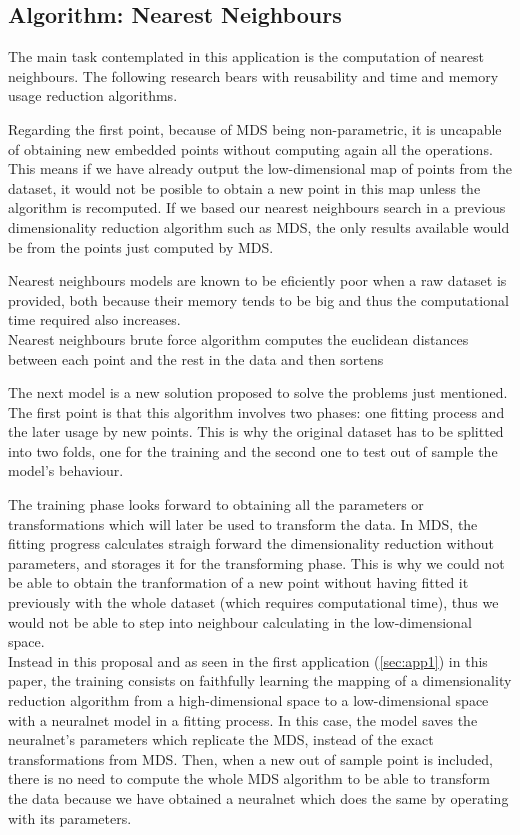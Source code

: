 \documentclass[a4paper,11pt,spanish]{report}
\begin{document}
\subsection{Algorithm: Nearest Neighbours}
\label{ssec:nneigh}

The main task contemplated in this application is the computation of nearest neighbours. The following research bears with reusability and time and memory usage reduction algorithms.

Regarding the first point, because of MDS being non-parametric, it is uncapable of obtaining new embedded points without computing again all the operations. This means if we have already output the low-dimensional map of points from the dataset, it would not be posible to obtain a new point in this map unless the algorithm is recomputed. If we based our nearest neighbours search in a previous dimensionality reduction algorithm such as MDS, the only results available would be from the points just computed by MDS.

Nearest neighbours models are known to be eficiently poor when a raw dataset is provided, both because their memory tends to be big and thus the computational time required also increases.\\
Nearest neighbours brute force algorithm computes the euclidean distances between each point and the rest in the data and then sortens

The next model is a new solution proposed to solve the problems just mentioned.\\
The first point is that this algorithm involves two phases: one fitting process and the later usage by new points. This is why the original dataset has to be splitted into two folds, one for the training and the second one to test out of sample the model's behaviour.

The training phase looks forward to obtaining all the parameters or transformations which will later be used to transform the data. In MDS, the fitting progress calculates straigh forward the dimensionality reduction without parameters, and storages it for the transforming phase. This is why we could not be able to obtain the tranformation of a new point without having fitted it previously with the whole dataset (which requires computational time), thus we would not be able to step into neighbour calculating in the low-dimensional space.\\
Instead in this proposal and as seen in the first application (\ref{sec:app1}) in this paper, the training consists on faithfully learning the mapping of a dimensionality reduction algorithm from a high-dimensional space to a low-dimensional space with a neuralnet model in a fitting process. In this case, the model saves the neuralnet's parameters which replicate the MDS, instead of the exact transformations from MDS. Then, when a new out of sample point is included, there is no need to compute the whole MDS algorithm to be able to transform the data because we have obtained a neuralnet which does the same by operating with its parameters.
\end{document}
